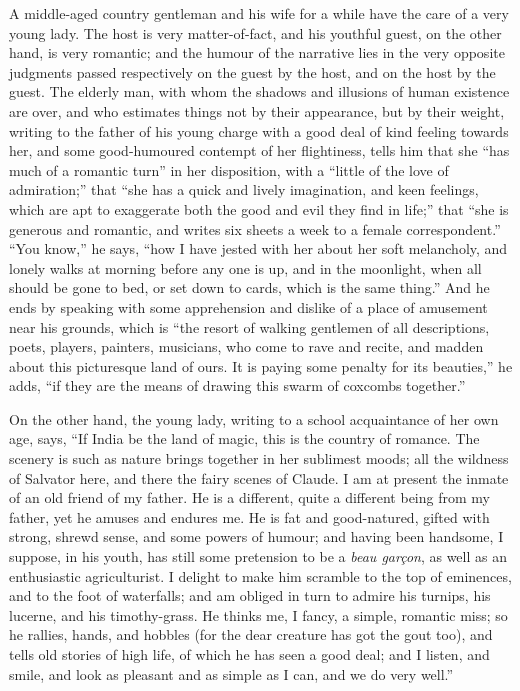 A middle-aged country gentleman and his wife for a
while have the care of a very young lady. The host is
very matter-of-fact, and his youthful guest, on the other
hand, is very romantic; and the humour of the narrative
lies in the very opposite judgments passed respectively
on the guest by the host, and on the host by the guest.
The elderly man, with whom the shadows and illusions of
human existence are over, and who estimates things not by
their appearance, but by their weight, writing to the
father of his young charge with a good deal of kind
feeling towards her, and some good-humoured contempt of
her flightiness, tells him that she ``has much of a
romantic turn'' in her disposition, with a ``little of
the love of admiration;'' that ``she has a quick
and lively imagination, and keen feelings, which are apt
to exaggerate both the good and evil they find in
life;'' that ``she is generous and romantic, and
writes six sheets a week to a female correspondent.''
``You know,'' he says, ``how I have jested
with her about her soft melancholy, and lonely walks at
morning before any one is up, and in the moonlight, when
all should be gone to bed, or set down to cards, which is
the same thing.'' And he ends by speaking with some
apprehension and dislike of a place of amusement near his
grounds, which is ``the resort of walking gentlemen
of all descriptions, poets, players, painters, musicians,
who come to rave and recite, and madden about this
picturesque land of ours. It is paying some penalty for
its beauties,'' he adds, ``if they are the means
of drawing this swarm of coxcombs together.''

On the other hand, the young lady, writing to a school
acquaintance of her own age, says, ``If India be the
land of magic, this is the country of romance. The
scenery is such as nature brings together in her
sublimest moods; all the wildness of Salvator here, and
there the fairy scenes of Claude. I am at present the
inmate of an old friend of my father. He is a different,
quite a different being from my father, yet he amuses and
endures me. He is fat and good-natured, gifted with
strong, shrewd sense, and some powers of humour; and
having been handsome, I suppose, in his youth, has still
some pretension to be a \emph{beau garçon}, as well as
an enthusiastic agriculturist. I delight to make him
scramble to the top of eminences, and to the foot of
waterfalls; and am obliged in turn to admire his turnips,
his lucerne, and his timothy-grass. He thinks me, I
fancy, a simple, romantic miss; so he rallies, hands, and
hobbles (for the dear creature has got the gout too), and
tells old stories of high life, of which he has seen a
good deal; and I listen, and smile, and look as pleasant
and as simple as I can, and we do very well.''

